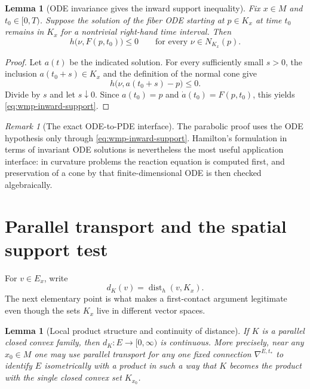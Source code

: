 \documentclass[10pt]{coll-l}
\newcommand{\dist}{\operatorname{dist}}
\newtheorem{lemma}[theorem]{Lemma}
\theoremstyle{definition}
\theoremstyle{remark}
\newtheorem{remark}[theorem]{Remark}
\numberwithin{section}{chapter}
\numberwithin{equation}{chapter}
\begin{document}
\begin{lemma}[ODE invariance gives the inward support inequality]
\label{lem:wmp-ode-support}
Fix $x\in M$ and $t_0\in[0,T)$.  Suppose the solution of the fiber ODE
starting at $p\in K_x$ at time $t_0$ remains in $K_x$ for a nontrivial
right-hand time interval.  Then
\begin{equation}
     h\bigl(\nu,F(p,t_0)\bigr)\leq0
     \qquad\text{for every }\nu\in N_{K_x}(p).             \label{eq:wmp-inward-support}
\end{equation}
\end{lemma}

\begin{proof}
Let $a(t)$ be the indicated solution.  For every sufficiently small $s>0$,
the inclusion $a(t_0+s)\in K_x$ and the definition of the normal cone give
\[
 h\bigl(\nu,a(t_0+s)-p\bigr)\leq0.
\]
Divide by $s$ and let $s\downarrow0$.  Since $a(t_0)=p$ and
$\dot a(t_0)=F(p,t_0)$, this yields
\eqref{eq:wmp-inward-support}.
\end{proof}

\begin{remark}[The exact ODE-to-PDE interface]
\label{rem:wmp-normal-interface}
The parabolic proof uses the ODE hypothesis only through
\eqref{eq:wmp-inward-support}.  Hamilton's formulation in terms of invariant
ODE solutions is nevertheless the most useful application interface: in
curvature problems the reaction equation is computed first, and preservation
of a cone by that finite-dimensional ODE is then checked algebraically.
\end{remark}

\section{Parallel transport and the spatial support test}
\label{sec:wmp-geodesic}

For $v\in E_x$, write
\[
      d_K(v)=\dist_h(v,K_x).
\]
The next elementary point is what makes a first-contact argument legitimate
even though the sets $K_x$ live in different vector spaces.

\begin{lemma}[Local product structure and continuity of distance]
\label{lem:wmp-distance-continuous}
If $K$ is a parallel closed convex family, then $d_K:E\to[0,\infty)$ is
continuous.  More precisely, near any $x_0\in M$ one may use parallel
transport for any one fixed connection $\nabla^{E,t_*}$ to identify
$E$ isometrically with a product in such a way that $K$ becomes the product
with the single closed convex set $K_{x_0}$.
\end{lemma}
\end{document}
